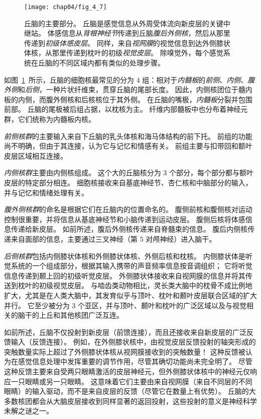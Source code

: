 \begin{figure}[htbp]
	\centering
	\texttt{[image: chap04/fig\_4\_7]}
	\caption{丘脑的主要部分。
		丘脑是感觉信息从外周受体流向新皮层的关键中继站。
		体感信息从\textit{背根神经节}传递到丘脑\textit{腹后外侧核}，然后从那里传递到\textit{初级体感皮层}。
		同样，来自\textit{视网膜}的视觉信息到达外侧膝状体核，从那里传递到枕叶的初级\textit{视觉皮层}。
		除嗅觉外，每个感觉系统在丘脑的不同区域内都有类似的处理步骤。}
	\label{fig:4_7}
\end{figure}


如图~\ref{fig:4_7}~所示，丘脑的细胞核最常见的分为 4 组：相对于\textit{内髓板}的\textit{前侧}、\textit{内侧}、\textit{腹外侧}和\textit{后侧}，一种片状纤维束，贯穿丘脑的尾部长度。
因此，内侧核团位于髓内板的内侧，而腹外侧核和后核核位于其外侧。
在丘脑的嘴极，\textit{内髓板}分裂并包围前部。
丘脑的尾极被后组占据，以枕核为主。
纤维内部髓板中也分布着神经元群，它们统称为内髓板内核。


\textit{前侧核群}的主要输入来自下丘脑的乳头体核和海马体结构的前下托。
前组的功能尚不明确，但由于其连接，认为它与记忆和情感有关。
前组主要与扣带回和额叶皮层区域相互连接。


\textit{内侧核群}主要由内侧核组成。
这个大的丘脑核分为 3 个部分，每个部分都与额叶皮层的特定部分相连。
细胞核接收来自基底神经节、杏仁核和中脑部分的输入，并与记忆和情绪处理有关。


\textit{腹外侧核群}的命名是根据它们在丘脑内的位置命名的。
腹侧前核和腹侧核对运动控制很重要，并将信息从基底神经节和小脑传递到运动皮层。
腹侧后核将体感信息传递给新皮层。
如前所述，腹后外侧核传递来自脊髓束的信息。
腹后内侧核传递来自面部的信息，主要通过三叉神经（第 5 对颅神经）进入脑干。


\textit{后侧核群}包括内侧膝状体核和外侧膝状体核、外侧后核和枕核。
内侧膝状体是听觉系统的一个组成部分，根据其输入携带的声音频率信息按音调组织；
它将听觉信息传递到颞上回的初级听觉皮层。
外侧膝状体接收来自视网膜的信息并将其传送到枕叶的初级视觉皮层。
与啮齿类动物相比，灵长类大脑中的枕骨不成比例地扩大，尤其是在人类大脑中，其发育似乎与顶叶、枕叶和颞叶皮层联合区域的扩大并行。
它至少被分为 3 个亚区，并与顶叶、颞叶和枕叶的广泛区域以及与视觉相关的脑干的上丘和其他核团广泛互连。


如前所述，丘脑不仅投射到新皮层（前馈连接），而且还接收来自新皮层的广泛反馈输入（反馈连接）。 
例如，在外侧膝状核中，由视觉皮层反馈投射的轴突形成的突触数量实际上超过了外侧膝状体核从视网膜接收到的突触数量！ 
这种反馈被认为在感觉信息处理中发挥重要的调节作用，尽管其确切功能尚未完全明了。
尽管这种反馈主要来自受两只眼睛激活的皮层神经元，但外侧膝状体核中的神经元仅响应一只眼睛或另一只眼睛。 
这意味着它们主要由来自视网膜（来自不同层的不同眼睛）的输入驱动，而不是来自皮层的反馈（尽管它在数量上有优势）。
丘脑的大多数核团都会从大脑皮层接收到同样显著的返回投射，这些投射的意义是神经科学未解之谜之一。


